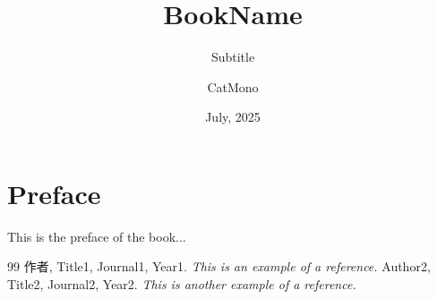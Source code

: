 \documentclass[11pt]{elegantbook}
\title{BookName} %
\subtitle{Subtitle} %
\author{CatMono} %
\date{July, 2025} %
\begin{document}
\maketitle %

\frontmatter        %
\tableofcontents    %

\chapter{Preface}   %
This is the preface of the book...

\mainmatter         %




\begin{thebibliography}{99} 
 作者, Title1, Journal1, Year1. \emph{ This is an example of a reference.}
 Author2, Title2, Journal2, Year2. \emph{ This is another example of a reference.}
\end{thebibliography}
\end{document}
